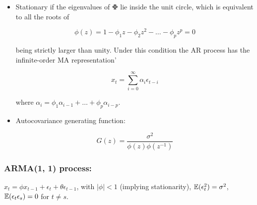 \begin{itemize}

\item Stationary if the eigenvalues of \(\boldsymbol{\Phi}\) lie inside the unit circle, which is equivalent to all the roots of

\[
\phi(z) = 1 - \phi_1 z - \phi_2 z^2 - \ldots - \phi_p z^p = 0
\]

being strictly larger than unity. Under this condition the AR process has the infinite-order MA representation'

\[
x_t = \sum_{i=0}^\infty \alpha_i \epsilon_{t-i}
\]

where \(\alpha_i = \phi_1 \alpha_{i-1} + \ldots + \phi_p \alpha_{i - p}\).

\item Autocovariance generating function:

\[
G(z) = \frac{\sigma^2}{\phi(z) \phi(z^{-1})}
\]

\end{itemize}


\subsubsection{ARMA(1, 1) process:} \(x_t = \phi x_{t-1} + \epsilon_t + \theta \epsilon_{t-1}\), with \(|\phi| < 1\) (implying stationarity), \(\mathbb{E}(\epsilon_t^2) = \sigma^2\), \(\mathbb{E}(\epsilon_t \epsilon_s ) = 0 \) for \(t \neq s\).

